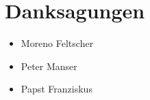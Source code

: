 \chapter*{Danksagungen}
\begin{itemize}
  \item Moreno Feltscher
  \item Peter Manser
  \item Papst Franziskus
\end{itemize}
